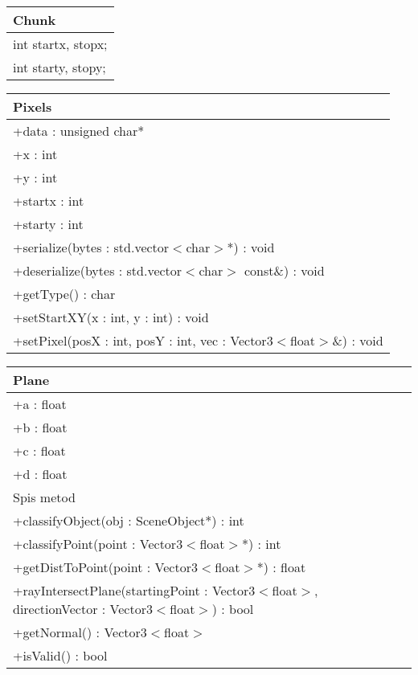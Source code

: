 \begin{center}
    \begin{tabular}{|l|}
    \hline
    Chunk \\ \hline
    int startx, stopx; \\
    int starty, stopy;  \\
    \hline
    \end{tabular}
\end{center}


\begin{center}
    \begin{tabular}{|l|}
    \hline
    Pixels \\ \hline
    +data : unsigned char* \\
    +x : int \\
    +y : int \\ 
    +startx : int \\
    +starty : int \\
    \hline
	+serialize(bytes : std.vector$<$char$>$*) : void \\
	+deserialize(bytes : std.vector$<$char$>$ const\&) : void \\
	+getType() : char \\
	+setStartXY(x : int, y : int) : void \\
	+setPixel(posX : int, posY : int, vec : Vector3$<$float$>$\&) : void \\
	\hline
    \end{tabular}
\end{center}

\begin{center}
    \begin{tabular}{|l|}
    \hline
    Plane \\ \hline
    +a : float \\ 
    +b : float \\
    +c : float \\
    +d : float \\
    \hline
	Spis metod \\ 
	+classifyObject(obj : SceneObject*) : int \\
	+classifyPoint(point : Vector3$<$float$>$*) : int \\
	+getDistToPoint(point : Vector3$<$float$>$*) : float \\
	+rayIntersectPlane(startingPoint : Vector3$<$float$>$, directionVector : Vector3$<$float$>$) : bool \\
	+getNormal() : Vector3$<$float$>$ \\
	+isValid() : bool \\
	\hline
    \end{tabular}
\end{center}

